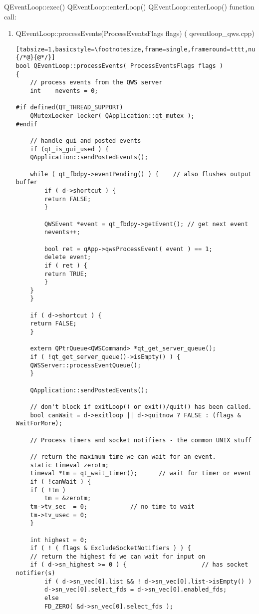 QEventLoop::exec() {\MbQ{}} QEventLoop::enterLoop(){\MaQ{}}\zZ
QEventLoop::enterLoop() {\MbQ{}} function call:

\begin{enumerate}
\item QEventLoop::processEvents(ProcessEventsFlags flags) ({\MaQ{}} qeventloop\_{}qws.cpp)

\begin{lstlisting}[tabsize=1,basicstyle=\footnotesize,frame=single,frameround=tttt,numbers=left,breaklines=true,title=\$QTDIR/src/kernel/qeventloop\_{}qws.cpp,escapeinside={/*@}{@*/}]
bool QEventLoop::processEvents( ProcessEventsFlags flags )
{
    // process events from the QWS server
    int	   nevents = 0;

#if defined(QT_THREAD_SUPPORT)
    QMutexLocker locker( QApplication::qt_mutex );
#endif

    // handle gui and posted events
    if (qt_is_gui_used ) {
	QApplication::sendPostedEvents();

	while ( qt_fbdpy->eventPending() ) {	// also flushes output buffer
	    if ( d->shortcut ) {
		return FALSE;
	    }

	    QWSEvent *event = qt_fbdpy->getEvent();	// get next event
	    nevents++;

	    bool ret = qApp->qwsProcessEvent( event ) == 1;
	    delete event;
	    if ( ret ) {
		return TRUE;
	    }
	}
    }

    if ( d->shortcut ) {
	return FALSE;
    }

    extern QPtrQueue<QWSCommand> *qt_get_server_queue();
    if ( !qt_get_server_queue()->isEmpty() ) {
	QWSServer::processEventQueue();
    }

    QApplication::sendPostedEvents();

    // don't block if exitLoop() or exit()/quit() has been called.
    bool canWait = d->exitloop || d->quitnow ? FALSE : (flags & WaitForMore);

    // Process timers and socket notifiers - the common UNIX stuff

    // return the maximum time we can wait for an event.
    static timeval zerotm;
    timeval *tm = qt_wait_timer();		// wait for timer or event
    if ( !canWait ) {
	if ( !tm )
	    tm = &zerotm;
	tm->tv_sec  = 0;			// no time to wait
	tm->tv_usec = 0;
    }

    int highest = 0;
    if ( ! ( flags & ExcludeSocketNotifiers ) ) {
	// return the highest fd we can wait for input on
	if ( d->sn_highest >= 0 ) {                     // has socket notifier(s)
	    if ( d->sn_vec[0].list && ! d->sn_vec[0].list->isEmpty() )
		d->sn_vec[0].select_fds = d->sn_vec[0].enabled_fds;
	    else
		FD_ZERO( &d->sn_vec[0].select_fds );


\end{lstlisting}
\end{enumerate}
